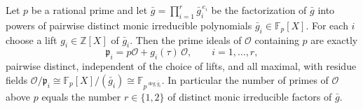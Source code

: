 \begin{proposition}
  \label{prop-3-2-1}
  Let $p$ be a rational prime and let $\bar g = \prod_{i=1}^{r}
  \bar g_i^{\,e_i}$ be the factorization of $\bar g$ into powers of pairwise
  distinct monic irreducible polynomials $\bar g_i \in \mathbb{F}_p[X]$. For
  each $i$ choose a lift $g_i \in \mathbb{Z}[X]$ of $\bar g_i$. Then the
  prime ideals of $\mathcal{O}$ containing $p$ are exactly
  \[
    \mathfrak{p}_i = p\mathcal{O} + g_i(\tau)\,\mathcal{O},
    \qquad i = 1, \dots, r,
  \]
  pairwise distinct, independent of the choice of lifts, and all maximal,
  with residue fields $\mathcal{O}/\mathfrak{p}_i \cong
  \mathbb{F}_p[X]/(\bar g_i) \cong \mathbb{F}_{p^{\deg \bar g_i}}$. In
  particular the number of primes of $\mathcal{O}$ above $p$ equals the
  number $r \in \{1, 2\}$ of distinct monic irreducible factors of $\bar g$.
\end{proposition}


